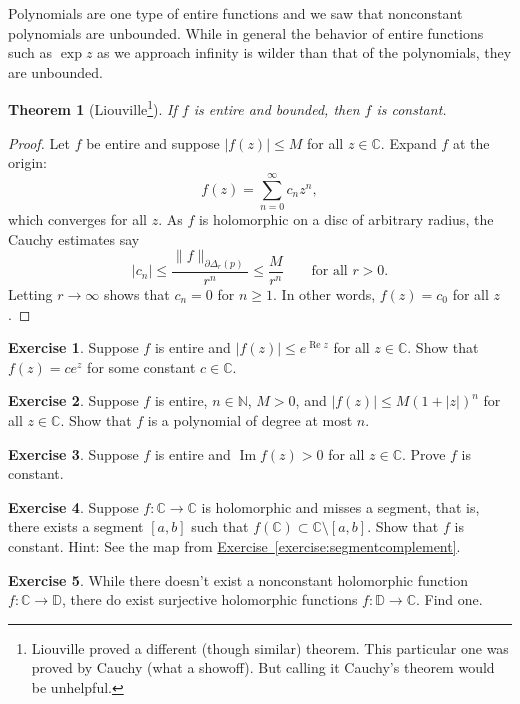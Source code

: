\documentclass[12pt,openany]{book}
\renewcommand{\Re}{\operatorname{Re}}
\renewcommand{\Im}{\operatorname{Im}}
\newcommand{\sabs}[1]{\lvert {#1} \rvert}
\newcommand{\snorm}[1]{\lVert {#1} \rVert}
\newcommand{\C}{{\mathbb{C}}}
\newcommand{\N}{{\mathbb{N}}}
\newcommand{\D}{{\mathbb{D}}}
\theoremstyle{plain}
\newtheorem{thm}{Theorem}[section]
\theoremstyle{remark}
\theoremstyle{definition}
\newenvironment{exbox}{%
    \def\FrameCommand{\vrule width 1pt \relax\hspace{10pt}}%
    \MakeFramed{\advance\hsize-\width\FrameRestore}%
}{%
    \endMakeFramed
}
\theoremstyle{exercise}
\newtheorem{exercise}{Exercise}[section]
\theoremstyle{example}
\newcommand{\exerciseref}[1]{\hyperref[#1]{Exercise~\ref*{#1}}}
\begin{document}
Polynomials are one type of entire functions and we saw that 
nonconstant polynomials are unbounded.  While in general the behavior of
entire functions such as $\exp z$ as we approach infinity is wilder than that of the
polynomials, they are unbounded.

\begin{thm}[Liouville\footnote{%
Liouville proved a different (though similar) theorem.  This particular one
was proved by Cauchy (what a showoff).  But calling it Cauchy's theorem would be
unhelpful.}]
%
\label{thm:Liouville}%
If $f$ is entire and bounded, then $f$ is constant.
\end{thm}

\begin{proof}
Let $f$ be entire and suppose $\sabs{f(z)} \leq M$ for all $z \in \C$.
Expand $f$ at the origin:
\begin{equation*}
f(z) = \sum_{n=0}^\infty c_n z^n ,
\end{equation*}
which converges for all $z$.
As $f$ is holomorphic on a disc of arbitrary radius, the Cauchy estimates
say
\begin{equation*}
\sabs{c_n} \leq \frac{\snorm{f}_{\partial \Delta_r(p)}}{r^n} \leq
\frac{M}{r^n}
\qquad \text{for all } r > 0 .
\end{equation*}
Letting $r \to \infty$ shows that $c_n = 0$ for $n \geq 1$.  In other
words, $f(z) = c_0$ for all $z$.
\end{proof}

\begin{exbox}
\begin{exercise}
Suppose $f$ is entire and $\sabs{f(z)} \leq e^{\Re z}$ for all $z \in
\C$.  Show that $f(z) = c e^z$ for some constant $c \in \C$.
\end{exercise}

\begin{exercise}
Suppose $f$ is entire, $n \in \N$, $M > 0$, and
$\sabs{f(z)} \leq M {(1+\sabs{z})}^n$ for all $z \in \C$.
Show that $f$ is a polynomial of degree at most $n$.
\end{exercise}

\begin{exercise}
Suppose $f$ is entire and $\Im f(z) > 0$ for all $z \in \C$.
Prove $f$ is constant.
\end{exercise}

\begin{exercise}
Suppose $f \colon \C \to \C$ is holomorphic and misses a segment,
that is, there exists a segment
$[a,b]$ such that $f(\C) \subset \C \setminus [a,b]$.
Show that $f$ is constant.  Hint: See the map from
\exerciseref{exercise:segmentcomplement}.
\end{exercise}

\begin{exercise}
While there doesn't exist a nonconstant holomorphic function $f \colon \C
\to \D$, there do exist surjective holomorphic functions $f \colon \D \to
\C$.  Find one.
\end{exercise}
\end{exbox}
\end{document}
